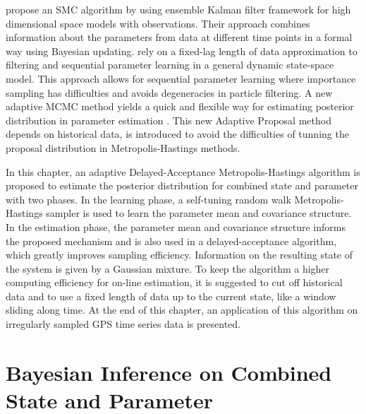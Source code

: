 \cite{stroud2016bayesian} propose an SMC algorithm by using ensemble Kalman filter framework for high dimensional space models with observations. Their approach combines information about the parameters from data at different time points in a formal way using Bayesian updating. \cite{polson2008practical} rely on a fixed-lag length of data approximation to filtering and sequential parameter learning in a general dynamic state-space model. This approach allows for sequential parameter learning where importance sampling has difficulties and avoids degeneracies in particle filtering. A new adaptive MCMC method yields a quick and flexible way for estimating posterior distribution in parameter estimation \citep{haario1999adaptive}. This new Adaptive Proposal method depends on historical data, is introduced to avoid the difficulties of tunning the proposal distribution in Metropolis-Hastings methods. 



In this chapter, an adaptive Delayed-Acceptance Metropolis-Hastings algorithm is proposed to estimate the posterior distribution for combined state and parameter with two phases. In the learning phase, a self-tuning random walk Metropolis-Hastings sampler is used to learn the parameter mean and covariance structure. In the estimation phase, the parameter mean and covariance structure informs the proposed mechanism and is also used in a delayed-acceptance algorithm, which greatly improves sampling efficiency. Information on the resulting state of the system is given by a Gaussian mixture. To keep the algorithm a higher computing efficiency for on-line estimation, it is suggested to cut off historical data and to use a fixed length of data up to the current state, like a window sliding along time. At the end of this chapter, an application of this algorithm on irregularly sampled GPS time series data is presented. 

%



\section{Bayesian Inference on Combined State and Parameter}

